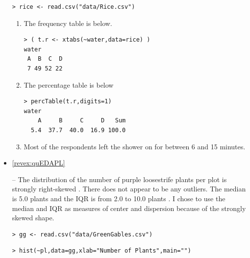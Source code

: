 \documentclass[10pt,openany]{book}\usepackage[]{graphicx}\usepackage[]{color}
\makeatletter
\newenvironment{kframe}{%
 \def\at@end@of@kframe{}%
 \ifinner\ifhmode%
  \def\at@end@of@kframe{\end{minipage}}%
  \begin{minipage}{\columnwidth}%
 \fi\fi%
 \def\FrameCommand##1{\hskip\@totalleftmargin \hskip-\fboxsep
 \colorbox{shadecolor}{##1}\hskip-\fboxsep
     \hskip-\linewidth \hskip-\@totalleftmargin \hskip\columnwidth}%
 \MakeFramed {\advance\hsize-\width
   \@totalleftmargin\z@ \linewidth\hsize
   \@setminipage}}%
 {\par\unskip\endMakeFramed%
 \at@end@of@kframe}
\newenvironment{knitrout}{}{} %
\makeatother
\begin{document}
\begin{itemize}
\begin{knitrout}
\color{fgcolor}\begin{kframe}
\begin{verbatim}
> rice <- read.csv("data/Rice.csv")
\end{verbatim}
\end{kframe}
\end{knitrout}
  \begin{enumerate}
    \item The frequency table is below.
\begin{knitrout}
\color{fgcolor}\begin{kframe}
\begin{verbatim}
> ( t.r <- xtabs(~water,data=rice) )
water
 A  B  C  D 
 7 49 52 22 
\end{verbatim}
\end{kframe}
\end{knitrout}
    \item The percentage table is below
\begin{knitrout}
\color{fgcolor}\begin{kframe}
\begin{verbatim}
> percTable(t.r,digits=1)
water
    A     B     C     D   Sum 
  5.4  37.7  40.0  16.9 100.0 
\end{verbatim}
\end{kframe}
\end{knitrout}
    \item Most of the respondents left the shower on for between 6 and 15 minutes.
  \end{enumerate}


  \item \hypertarget{ans:quEDAPL}{\ref{revex:quEDAPL}} --  The distribution of the number of purple loosestrife plants per plot is strongly right-skewed .  There does not appear to be any outliers.  The median is 5.0 plants and the IQR is from 2.0 to 10.0 plants .  I chose to use the median and IQR as measures of center and dispersion because of the strongly skewed shape.
\begin{knitrout}
\color{fgcolor}\begin{kframe}
\begin{verbatim}
> gg <- read.csv("data/GreenGables.csv")
\end{verbatim}
\end{kframe}
\end{knitrout}
\begin{knitrout}
\color{fgcolor}\begin{kframe}
\begin{verbatim}
> hist(~pl,data=gg,xlab="Number of Plants",main="")
\end{verbatim}
\end{kframe}\begin{figure}[hbtp]


\end{figure}
\end{knitrout}
\end{itemize}
\end{document}
